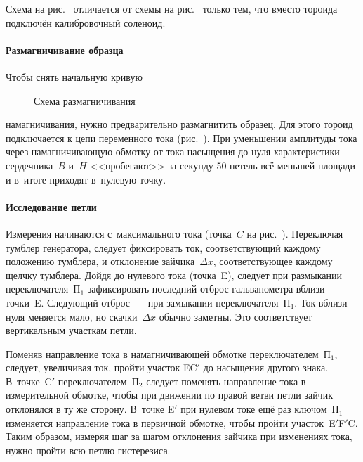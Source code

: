 Схема на рис.~ отличается от схемы на
рис.~ только тем, что вместо тороида
подключён калибровочный соленоид.

%



\paragraph{Размагничивание образца}
Чтобы снять начальную кривую 
\begin{wrapfigure}[8]{r}{0.5\textwidth}
    \centering
    \caption{Схема размагничивания}
\end{wrapfigure}
намагничивания, нужно предварительно 
размагнитить образец.
Для этого тороид подключается к цепи переменного тока
(рис.~). При уменьшении амплитуды тока через
намагничивающую обмотку от тока насыщения до нуля характеристики сердечника~$B$
и~$H$ <<пробегают>> за секунду 50 петель всё меньшей площади и в~итоге
приходят в~нулевую точку.



\paragraph{Исследование петли}
Измерения начинаются с~максимального тока (точка~$C$ на рис.~). Переключая тумблер генератора,
следует фиксировать ток, соответствующий каждому положению тумблера, и
отклонение зайчика~$\Delta x$, соответствующее
каждому щелчку тумблера. Дойдя до нулевого тока
(точка~E), следует при размыкании переключателя~$\text{П}_1$ 
зафиксировать последний отброс гальванометра вблизи точки~E. Следующий
отброс~--- при замыкании переключателя~$\text{П}_1$. 
Ток вблизи нуля меняется мало, но скачки~$\Delta x$ обычно заметны. 
Это соответствует вертикальным участкам петли.

Поменяв направление тока в намагничивающей обмотке переключателем~$\text{П}_1$,
следует, увеличивая ток, пройти участок EC$'$ до
насыщения другого знака. В~точке~C$'$ переключателем~$\text{П}_2$ следует
поменять направление тока в измерительной обмотке, чтобы при
движении по правой ветви петли зайчик отклонялся в ту же сторону. 
В~точке E$'$ при нулевом токе ещё раз ключом~$\text{П}_1$
изменяется направление тока в первичной обмотке, чтобы пройти участок~E$'$F$'$C.
Таким образом, измеряя шаг за шагом отклонения зайчика при изменениях тока, 
нужно пройти всю петлю гистерезиса.

